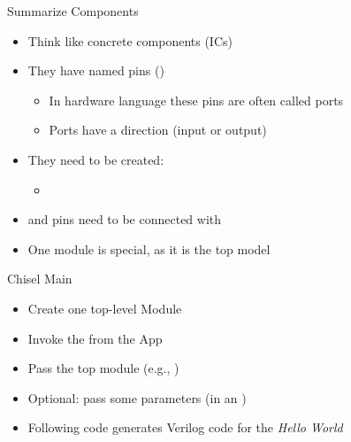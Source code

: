 \begin{frame}[fragile]{Summarize Components}
\begin{itemize}
\item Think like concrete components (ICs)
\item They have named pins ()
\begin{itemize}
\item In hardware language these pins are often called ports
\item Ports have a direction (input or output)
\end{itemize}
\item They need to be created:
\begin{itemize}
\item {}
\end{itemize}
\item and pins need to be connected with \code{:=}
\item One module is special, as it is the top model
\end{itemize}
\end{frame}




\begin{frame}[fragile]{Chisel Main}

\begin{itemize}
\item Create one top-level Module
\item Invoke the  from the App
\item Pass the top module (e.g., )
\item Optional: pass some parameters (in an )
\item Following code generates Verilog code for the \emph{Hello World}
\end{itemize}
\end{frame}

